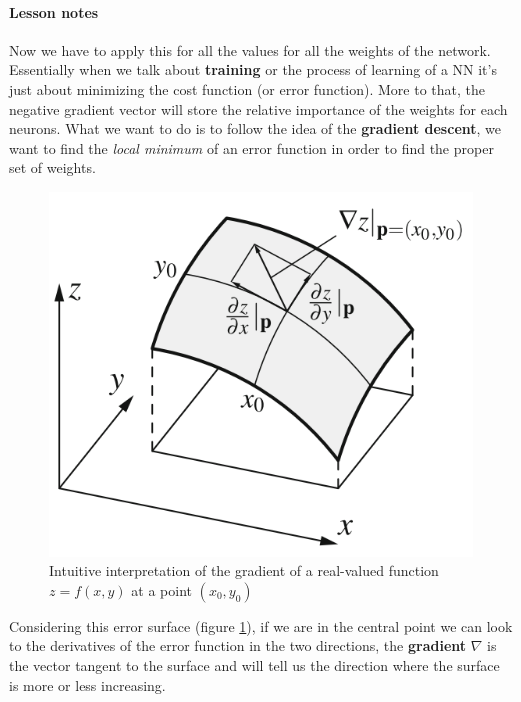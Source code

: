 \documentclass{article}
\begin{document}
\paragraph{Lesson notes}
Now we have to apply this for all the values for all the weights of the network. Essentially when
we talk about \textbf{training} or the process of learning of a NN it's just about minimizing the
cost function (or error function). More to that, the negative gradient vector will store
the relative importance of the weights for each neurons.
\newline\newline
What we want to do is to follow the idea of the \textbf{gradient descent}, we want
to find the \textit{local minimum} of an error function in order to find the proper set of weights.
\begin{figure}[H]
    \centering
    \includegraphics[scale=0.5]{images/gradienmt.png}
    \caption{Intuitive interpretation of the gradient of a real-valued function $z=f(x,y)$ at
        a point $(x_0,y_0)$}
    \label{fig:err_surface}
\end{figure}
Considering this error surface (figure \ref{fig:err_surface}), if we are in the
central point we can look to the derivatives of the error function in the two directions,
the \textbf{gradient} $\nabla$ is the vector tangent to the surface and will tell us the direction where
the surface is more or less increasing.
\newline\newline
\end{document}

